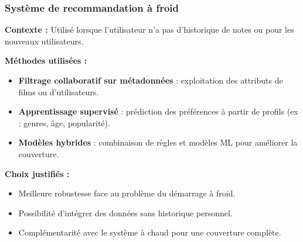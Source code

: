 \documentclass{beamer}
\begin{document}
    \begin{frame}
        \scriptsize
        \frametitle{Système de recommandation à froid}
        \textbf{Contexte :} Utilisé lorsque l’utilisateur n’a pas d’historique de notes ou pour les nouveaux utilisateurs.

        \vspace{0.3cm}
        \textbf{Méthodes utilisées :}
        \begin{itemize}
            \item \textbf{Filtrage collaboratif sur métadonnées} : exploitation des attributs de films ou d’utilisateurs.
            \item \textbf{Apprentissage supervisé} : prédiction des préférences à partir de profils (ex : genres, âge, popularité).
            \item \textbf{Modèles hybrides} : combinaison de règles et modèles ML pour améliorer la couverture.
        \end{itemize}

        \vspace{0.3cm}
        \textbf{Choix justifiés :}
        \begin{itemize}
            \item Meilleure robustesse face au problème du démarrage à froid.
            \item Possibilité d'intégrer des données sans historique personnel.
            \item Complémentarité avec le système à chaud pour une couverture complète.
        \end{itemize}
    \end{frame}




\end{document}
